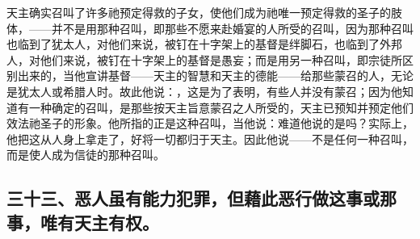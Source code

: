 天主确实召叫了许多祂预定得救的子女，使他们成为祂唯一预定得救的圣子的肢体，——并不是用那种召叫，即那些不愿来赴婚宴的人所受的召叫，因为那种召叫也临到了犹太人，对他们来说，被钉在十字架上的基督是绊脚石，也临到了外邦人，对他们来说，被钉在十字架上的基督是愚妄；而是用另一种召叫，即宗徒所区别出来的，当他宣讲基督——天主的智慧和天主的德能——给那些蒙召的人，无论是犹太人或希腊人时。故此他说：，这是为了表明，有些人并没有蒙召；因为他知道有一种确定的召叫，是那些按天主旨意蒙召之人所受的，天主已预知并预定他们效法祂圣子的形象。他所指的正是这种召叫，当他说：难道他说的是吗？实际上，他把这从人身上拿走了，好将一切都归于天主。因此他说——不是任何一种召叫，而是使人成为信徒的那种召叫。\par


\subsection{三十三、恶人虽有能力犯罪，但藉此恶行做这事或那事，唯有天主有权。}


